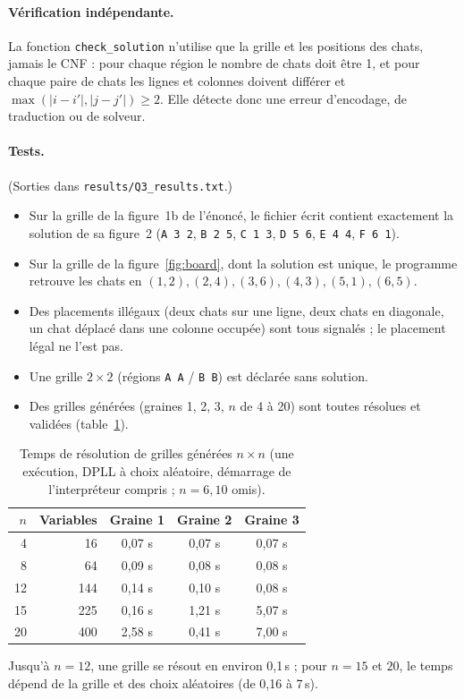 \documentclass[11pt,a4paper]{article}
\begin{document}
\paragraph{Vérification indépendante.} La fonction \texttt{check\_solution} n'utilise que la grille et les positions des chats, jamais le CNF : pour chaque région le nombre de chats doit être 1, et pour chaque paire de chats les lignes et colonnes doivent différer et $\max(|i-i'|,|j-j'|)\ge2$. Elle détecte donc une erreur d'encodage, de traduction ou de solveur.

\paragraph{Tests.} (Sorties dans \texttt{results/Q3\_results.txt}.)
\begin{itemize}
\item Sur la grille de la figure~1b de l'énoncé, le fichier écrit contient exactement la solution de sa figure~2 (\texttt{A 3 2}, \texttt{B 2 5}, \texttt{C 1 3}, \texttt{D 5 6}, \texttt{E 4 4}, \texttt{F 6 1}).
\item Sur la grille de la figure~\ref{fig:board}, dont la solution est unique, le programme retrouve les chats en $(1,2),(2,4),(3,6),(4,3),(5,1),(6,5)$.
\item Des placements illégaux (deux chats sur une ligne, deux chats en diagonale, un chat déplacé dans une colonne occupée) sont tous signalés ; le placement légal ne l'est pas.
\item Une grille $2\times2$ (régions \texttt{A A} / \texttt{B B}) est déclarée sans solution.
\item Des grilles générées (graines 1, 2, 3, $n$ de 4 à 20) sont toutes résolues et validées (table~\ref{tab:q3}).
\end{itemize}
\begin{table}[H]
\centering\small
\begin{tabular}{@{}rrccc@{}}
\toprule
$n$ & Variables & Graine 1 & Graine 2 & Graine 3\\
\midrule
4 & 16 & 0,07 s & 0,07 s & 0,07 s\\
8 & 64 & 0,09 s & 0,08 s & 0,08 s\\
12 & 144 & 0,14 s & 0,10 s & 0,08 s\\
15 & 225 & 0,16 s & 1,21 s & 5,07 s\\
20 & 400 & 2,58 s & 0,41 s & 7,00 s\\
\bottomrule
\end{tabular}
\caption{Temps de résolution de grilles générées $n\times n$ (une exécution, DPLL à choix aléatoire, démarrage de l'interpréteur compris ; $n=6,10$ omis).}
\label{tab:q3}
\end{table}
Jusqu'à $n=12$, une grille se résout en environ 0,1\,s ; pour $n=15$ et $20$, le temps dépend de la grille et des choix aléatoires (de 0,16 à 7\,s).
\end{document}
